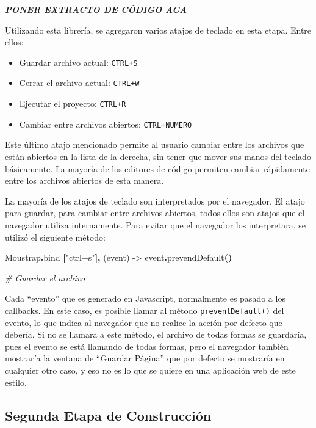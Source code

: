\documentclass[12pt,titlepage,]{article}
\newenvironment{Shaded}{}{}
\newcommand{\KeywordTok}[1]{\textcolor[rgb]{0.00,0.44,0.13}{\textbf{{#1}}}}
\newcommand{\StringTok}[1]{\textcolor[rgb]{0.25,0.44,0.63}{{#1}}}
\newcommand{\CommentTok}[1]{\textcolor[rgb]{0.38,0.63,0.69}{\textit{{#1}}}}
\newcommand{\FunctionTok}[1]{\textcolor[rgb]{0.02,0.16,0.49}{{#1}}}
\newcommand{\NormalTok}[1]{{#1}}
\begin{document}
\textbf{\emph{PONER EXTRACTO DE CÓDIGO ACA}}

Utilizando esta librería, se agregaron varios atajos de teclado en esta
etapa. Entre ellos:

\begin{itemize}
\item
  Guardar archivo actual: \texttt{CTRL+S}
\item
  Cerrar el archivo actual: \texttt{CTRL+W}
\item
  Ejecutar el proyecto: \texttt{CTRL+R}
\item
  Cambiar entre archivos abiertos: \texttt{CTRL+NUMERO}
\end{itemize}

Este último atajo mencionado permite al usuario cambiar entre los
archivos que están abiertos en la lista de la derecha, sin tener que
mover sus manos del teclado básicamente. La mayoría de los editores de
código permiten cambiar rápidamente entre los archivos abiertos de esta
manera.

La mayoría de los atajos de teclado son interpretados por el navegador.
El atajo para guardar, para cambiar entre archivos abiertos, todos ellos
son atajos que el navegador utiliza internamente. Para evitar que el
navegador los interpretara, se utilizó el siguiente método:

\begin{Shaded}
\begin{Highlighting}[]
\NormalTok{Moustrap}\KeywordTok{.}\NormalTok{bind }\KeywordTok{[}\StringTok{"ctrl+s"}\KeywordTok{],} \FunctionTok{(event) ->}
  \NormalTok{event}\KeywordTok{.}\NormalTok{prevendDefault}\KeywordTok{()}
  
  \CommentTok{# Guardar el archivo}
\end{Highlighting}
\end{Shaded}

Cada ``evento'' que es generado en Javascript, normalmente es pasado a
los callbacks. En este caso, es posible llamar al método
\texttt{preventDefault()} del evento, lo que indica al navegador que no
realice la acción por defecto que debería. Si no se llamara a este
método, el archivo de todas formas se guardaría, pues el evento se está
llamando de todas formas, pero el navegador también mostraría la ventana
de ``Guardar Página'' que por defecto se mostraría en cualquier otro
caso, y eso no es lo que se quiere en una aplicación web de este estilo.

\subsection{Segunda Etapa de Construcción}
\end{document}
